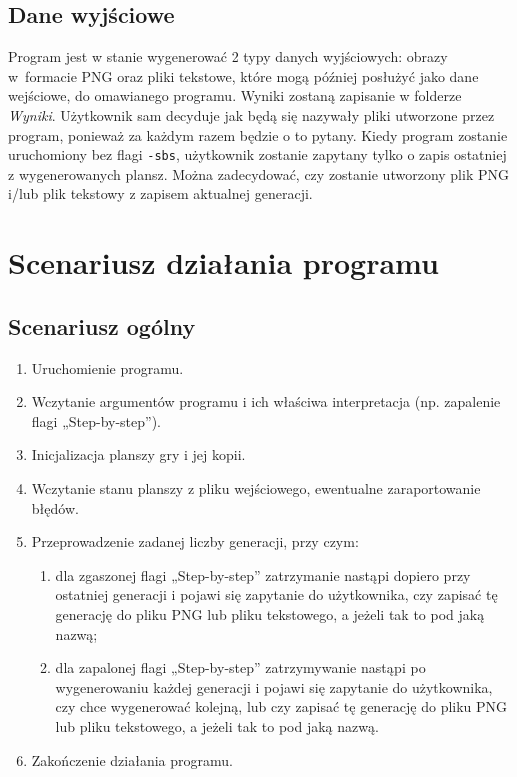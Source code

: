 \documentclass[12pt]{report}
\newcommand{\code}[1]{\texttt{#1}}
\begin{document}
\subsection{Dane wyjściowe}
Program jest w stanie wygenerować 2 typy danych wyjściowych: obrazy w~formacie PNG oraz pliki tekstowe, które mogą później posłużyć jako dane wejściowe, do omawianego programu. Wyniki zostaną zapisanie w folderze \textit{Wyniki}. Użytkownik sam decyduje jak będą się nazywały pliki utworzone przez program, ponieważ za każdym razem będzie o to pytany. Kiedy program zostanie uruchomiony bez flagi \code{-sbs}, użytkownik zostanie zapytany tylko o zapis ostatniej z wygenerowanych plansz. Można zadecydować, czy zostanie utworzony plik PNG i/lub plik tekstowy z zapisem aktualnej generacji.
\section{Scenariusz działania programu}
\subsection{Scenariusz ogólny}
\begin{enumerate}
    \item Uruchomienie programu.
    \item Wczytanie argumentów programu i ich właściwa interpretacja (np. zapalenie flagi „Step-by-step”).
    \item Inicjalizacja planszy gry i jej kopii.
    \item Wczytanie stanu planszy z pliku wejściowego, ewentualne zaraportowanie błędów.
    \item Przeprowadzenie zadanej liczby generacji, przy czym:
    \begin{enumerate}
        \item	dla zgaszonej flagi „Step-by-step” zatrzymanie nastąpi dopiero przy ostatniej generacji i pojawi się zapytanie do użytkownika, czy zapisać tę generację do pliku PNG lub pliku tekstowego, a jeżeli tak to pod jaką nazwą;
        \item	dla zapalonej flagi „Step-by-step” zatrzymywanie nastąpi po wygenerowaniu każdej generacji i pojawi się zapytanie do użytkownika, czy chce wygenerować kolejną, lub czy zapisać tę generację do pliku PNG lub pliku tekstowego, a jeżeli tak to pod jaką nazwą.
    \end{enumerate}
    \item Zakończenie działania programu.
\end{enumerate}
\end{document}
